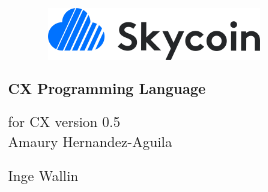 \documentclass[11pt,fleqn,openany]{book} %
\begin{document}
\raggedbottom


\begingroup
\thispagestyle{empty}
\centering

\vspace*{2.5cm}

\begin{figure}[h]
    \centering
    \includegraphics[width=0.5\textwidth]{img/skycoin-logo.png}
\end{figure}

\vspace*{2.5cm}
\par\normalfont\fontsize{35}{35}\sffamily\selectfont
\textbf{CX Programming Language}\\
\par\normalfont\fontsize{20}{20}\sffamily\selectfont
\vspace*{0.5cm}
{for CX version 0.5}\\

\vspace*{1cm}
{\Huge Amaury Hernandez-Aguila}\par %
{\Huge Inge Wallin}\par %

\endgroup


\newpage
~\vfill
\thispagestyle{empty}



\end{document}
